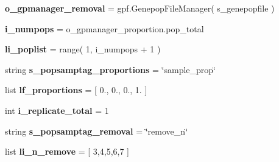 \begin{DoxyCompactItemize}
\item 
{\bfseries o\+\_\+gpmanager\+\_\+removal} = gpf.\+Genepop\+File\+Manager( s\+\_\+genepopfile )\hypertarget{namespacenegui_1_1genepopfilesampler_a3aa57a11f569457b2f749182fbe28dca}{}\label{namespacenegui_1_1genepopfilesampler_a3aa57a11f569457b2f749182fbe28dca}

\item 
{\bfseries i\+\_\+numpops} = o\+\_\+gpmanager\+\_\+proportion.\+pop\+\_\+total\hypertarget{namespacenegui_1_1genepopfilesampler_ab6d663a8c7e6a8cb1b164f785b27a512}{}\label{namespacenegui_1_1genepopfilesampler_ab6d663a8c7e6a8cb1b164f785b27a512}

\item 
{\bfseries li\+\_\+poplist} = range( 1, i\+\_\+numpops + 1 )\hypertarget{namespacenegui_1_1genepopfilesampler_afed5a5353ce42556452ed992c591f30d}{}\label{namespacenegui_1_1genepopfilesampler_afed5a5353ce42556452ed992c591f30d}

\item 
string {\bfseries s\+\_\+popsamptag\+\_\+proportions} = \char`\"{}sample\+\_\+prop\char`\"{}\hypertarget{namespacenegui_1_1genepopfilesampler_a54e108a8adc7df4d4d19ac8597f6129a}{}\label{namespacenegui_1_1genepopfilesampler_a54e108a8adc7df4d4d19ac8597f6129a}

\item 
list {\bfseries lf\+\_\+proportions} = \mbox{[} 0., 0., 0., 1. \mbox{]}\hypertarget{namespacenegui_1_1genepopfilesampler_a1ea52d1f17a0e0d5e09e8e9a2aa40cb2}{}\label{namespacenegui_1_1genepopfilesampler_a1ea52d1f17a0e0d5e09e8e9a2aa40cb2}

\item 
int {\bfseries i\+\_\+replicate\+\_\+total} = 1\hypertarget{namespacenegui_1_1genepopfilesampler_a95c5c4e65f66491edbb23083ab48bf70}{}\label{namespacenegui_1_1genepopfilesampler_a95c5c4e65f66491edbb23083ab48bf70}

\item 
string {\bfseries s\+\_\+popsamptag\+\_\+removal} = \char`\"{}remove\+\_\+n\char`\"{}\hypertarget{namespacenegui_1_1genepopfilesampler_aa7191fe2bed86b9b52bac7ae7c224688}{}\label{namespacenegui_1_1genepopfilesampler_aa7191fe2bed86b9b52bac7ae7c224688}

\item 
list {\bfseries li\+\_\+n\+\_\+remove} = \mbox{[} 3,4,5,6,7 \mbox{]}\hypertarget{namespacenegui_1_1genepopfilesampler_a3bb85be4ed96fe659c32a15fd54c9e91}{}\label{namespacenegui_1_1genepopfilesampler_a3bb85be4ed96fe659c32a15fd54c9e91}


\end{DoxyCompactItemize}
